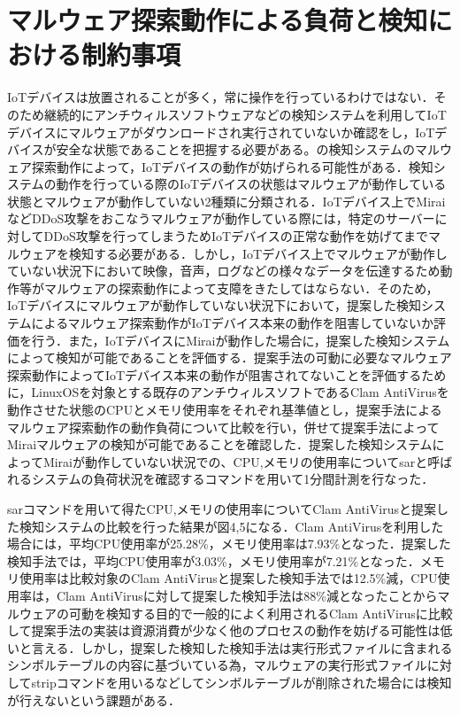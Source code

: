 \newpage
\section{マルウェア探索動作による負荷と検知における制約事項}

IoTデバイスは放置されることが多く，常に操作を行っているわけではない．そのため継続的にアンチウィルスソフトウェアなどの検知システムを利用してIoTデバイスにマルウェアがダウンロードされ実行されていないか確認をし，IoTデバイスが安全な状態であることを把握する必要がある。の検知システムのマルウェア探索動作によって，IoTデバイスの動作が妨げられる可能性がある．検知システムの動作を行っている際のIoTデバイスの状態はマルウェアが動作している状態とマルウェアが動作していない2種類に分類される．IoTデバイス上でMiraiなどDDoS攻撃をおこなうマルウェアが動作している際には，特定のサーバーに対してDDoS攻撃を行ってしまうためIoTデバイスの正常な動作を妨げてまでマルウェアを検知する必要がある．しかし，IoTデバイス上でマルウェアが動作していない状況下において映像，音声，ログなどの様々なデータを伝達するため動作等がマルウェアの探索動作によって支障をきたしてはならない．そのため，IoTデバイスにマルウェアが動作していない状況下において，提案した検知システムによるマルウェア探索動作がIoTデバイス本来の動作を阻害していないか評価を行う．また，IoTデバイスにMiraiが動作した場合に，提案した検知システムによって検知が可能であることを評価する．提案手法の可動に必要なマルウェア探索動作によってIoTデバイス本来の動作が阻害されてないことを評価するために，LinuxOSを対象とする既存のアンチウィルスソフトであるClam AntiVirusを動作させた状態のCPUとメモリ使用率をそれぞれ基準値とし，提案手法によるマルウェア探索動作の動作負荷について比較を行い，併せて提案手法によってMiraiマルウェアの検知が可能であることを確認した．提案した検知システムによってMiraiが動作していない状況での、CPU,メモリの使用率についてsarと呼ばれるシステムの負荷状況を確認するコマンドを用いて1分間計測を行なった．


sarコマンドを用いて得たCPU,メモリの使用率についてClam AntiVirusと提案した検知システムの比較を行った結果が図4,5になる．Clam AntiVirusを利用した場合には，平均CPU使用率が25.28\%，メモリ使用率は7.93\%となった．提案した検知手法では，平均CPU使用率が3.03\%，メモリ使用率が7.21\%となった．メモリ使用率は比較対象のClam AntiVirusと提案した検知手法では12.5\%減，CPU使用率は，Clam AntiVirusに対して提案した検知手法は88\%減となったことからマルウェアの可動を検知する目的で一般的によく利用されるClam AntiVirusに比較して提案手法の実装は資源消費が少なく他のプロセスの動作を妨げる可能性は低いと言える．しかし，提案した検知した検知手法は実行形式ファイルに含まれるシンボルテーブルの内容に基づいている為，マルウェアの実行形式ファイルに対してstripコマンドを用いるなどしてシンボルテーブルが削除された場合には検知が行えないという課題がある．

